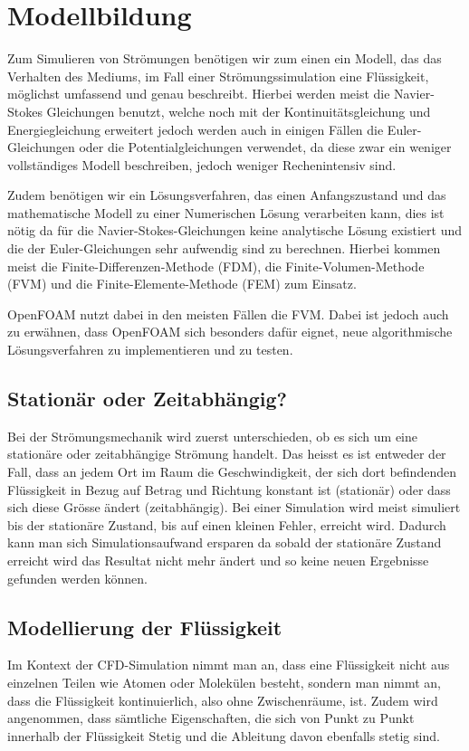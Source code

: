 %
%
%
%
\section{Modellbildung
\label{openfoam:section:teil1}}
Zum Simulieren von Strömungen benötigen wir zum einen ein Modell, das das Verhalten des Mediums, im Fall einer Strömungssimulation eine Flüssigkeit, möglichst umfassend und genau beschreibt. 
Hierbei werden meist die Navier-Stokes Gleichungen benutzt, welche noch mit der Kontinuitätsgleichung und Energiegleichung erweitert jedoch werden auch in einigen Fällen die Euler-Gleichungen oder die Potentialgleichungen verwendet, da diese zwar ein weniger vollständiges Modell beschreiben, jedoch weniger Rechenintensiv sind.

Zudem benötigen wir ein Lösungsverfahren, das einen Anfangszustand und das mathematische Modell zu einer Numerischen Lösung verarbeiten kann, dies ist nötig da für die Navier-Stokes-Gleichungen keine analytische Lösung existiert und die der Euler-Gleichungen sehr aufwendig sind zu berechnen. 
Hierbei kommen meist die Finite-Differenzen-Methode (FDM), die Finite-Volumen-Methode (FVM) und die Finite-Elemente-Methode (FEM) zum Einsatz. 

OpenFOAM nutzt dabei in den meisten Fällen die FVM. 
Dabei ist jedoch auch zu erwähnen, dass OpenFOAM sich besonders dafür eignet, neue algorithmische Lösungsverfahren zu implementieren und zu testen.

\subsection{Stationär oder Zeitabhängig?}
Bei der Strömungsmechanik wird zuerst unterschieden, ob es sich um eine stationäre oder zeitabhängige Strömung handelt.
Das heisst es ist entweder der Fall, dass an jedem Ort im Raum die Geschwindigkeit, der sich dort befindenden Flüssigkeit in Bezug auf Betrag und Richtung konstant ist (stationär) oder dass sich diese Grösse ändert (zeitabhängig).
Bei einer Simulation wird meist simuliert bis der stationäre Zustand, bis auf einen kleinen Fehler, erreicht wird.
Dadurch kann man sich Simulationsaufwand ersparen da sobald der stationäre Zustand erreicht wird das Resultat nicht mehr ändert und so keine neuen Ergebnisse gefunden werden können.

\subsection{Modellierung der Flüssigkeit}
Im Kontext der CFD-Simulation nimmt man an, dass eine Flüssigkeit nicht aus einzelnen Teilen wie Atomen oder Molekülen besteht, sondern man nimmt an, dass die Flüssigkeit kontinuierlich, also ohne Zwischenräume, ist. 
Zudem wird angenommen, dass sämtliche Eigenschaften, die sich von Punkt zu Punkt innerhalb der Flüssigkeit Stetig und die Ableitung davon ebenfalls stetig sind. 

